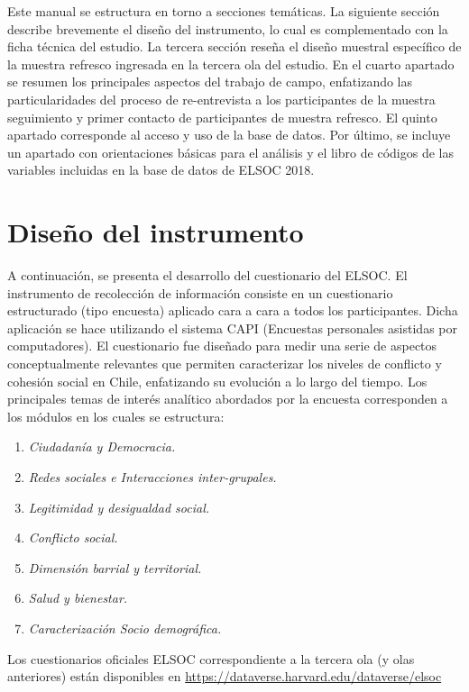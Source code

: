 \documentclass[
  openany]{book}
\providecommand{\tightlist}{%
  \setlength{\itemsep}{0pt}\setlength{\parskip}{0pt}}
\begin{document}
Este manual se estructura en torno a secciones temáticas. La siguiente sección describe brevemente el diseño del instrumento, lo cual es complementado con la ficha técnica del estudio. La tercera sección reseña el diseño muestral específico de la muestra refresco ingresada en la tercera ola del estudio. En el cuarto apartado se resumen los principales aspectos del trabajo de campo, enfatizando las particularidades del proceso de re-entrevista a los participantes de la muestra seguimiento y primer contacto de participantes de muestra refresco. El quinto apartado corresponde al acceso y uso de la base de datos. Por último, se incluye un apartado con orientaciones básicas para el análisis y el libro de códigos de las variables incluidas en la base de datos de ELSOC 2018.

\hypertarget{dis_ins}{%
\chapter{Diseño del instrumento}\label{dis_ins}}

A continuación, se presenta el desarrollo del cuestionario del ELSOC. El instrumento de recolección de información consiste en un cuestionario estructurado (tipo encuesta) aplicado cara a cara a todos los participantes. Dicha aplicación se hace utilizando el sistema CAPI (Encuestas personales asistidas por computadores). El cuestionario fue diseñado para medir una serie de aspectos conceptualmente relevantes que permiten caracterizar los niveles de conflicto y cohesión social en Chile, enfatizando su evolución a lo largo del tiempo. Los principales temas de interés analítico abordados por la encuesta corresponden a los módulos en los cuales se estructura:

\begin{enumerate}
\def\labelenumi{\arabic{enumi}.}
\tightlist
\item
  \emph{Ciudadanía y Democracia.}
\item
  \emph{Redes sociales e Interacciones inter-grupales.}
\item
  \emph{Legitimidad y desigualdad social.}
\item
  \emph{Conflicto social.}
\item
  \emph{Dimensión barrial y territorial.}
\item
  \emph{Salud y bienestar.}
\item
  \emph{Caracterización Socio demográfica.}
\end{enumerate}

Los cuestionarios oficiales ELSOC correspondiente a la tercera ola (y olas anteriores) están disponibles en \url{https://dataverse.harvard.edu/dataverse/elsoc}
\end{document}
